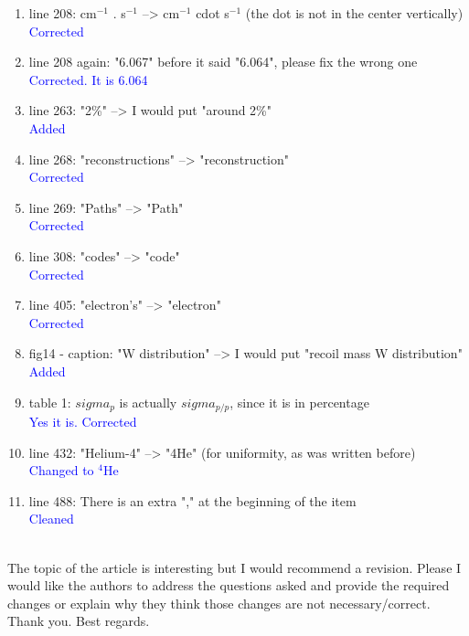 \documentclass[a4paper,11pt,twoside]{article}
\begin{document}
\begin{enumerate}
\item line 208: cm$^{-1}$ . s$^{-1}$ --> cm$^{-1}$ cdot s$^{-1}$ (the dot is 
   not in the center vertically)\\
\textcolor{blue}{Corrected} 

\item line 208 again: "6.067" before it said "6.064", please fix the wrong one
\textcolor{blue}{Corrected. It is 6.064} \\

\item line 263: "2\%" --> I would put "around 2\%"\\
\textcolor{blue}{Added} 

\item line 268: "reconstructions" --> "reconstruction"\\
\textcolor{blue}{Corrected } 

\item line 269: "Paths" --> "Path"\\
\textcolor{blue}{Corrected} 

\item line 308: "codes" --> "code"\\
\textcolor{blue}{Corrected} 

\item line 405: "electron's" --> "electron"\\
\textcolor{blue}{Corrected} 

\item fig14 - caption: "W distribution" --> I would put "recoil mass W 
   distribution"\\
\textcolor{blue}{Added} 

\item table 1: $sigma_{p}$ is actually $sigma_{p/p}$, since it is in 
   percentage\\
\textcolor{blue}{Yes it is. Corrected } 

\item line 432: "Helium-4" --> "4He" (for uniformity, as was written before)\\
\textcolor{blue}{Changed to $^4$He} 

\item line 488: There is an extra "," at the beginning of the item\\
\textcolor{blue}{Cleaned}\\
~\\
\end{enumerate}

The topic of the article is interesting but I would recommend a revision.  
Please I would like the authors to address the questions asked and provide the 
required changes or explain why they think those changes are not 
necessary/correct. Thank you. Best regards.\\
\end{document}
